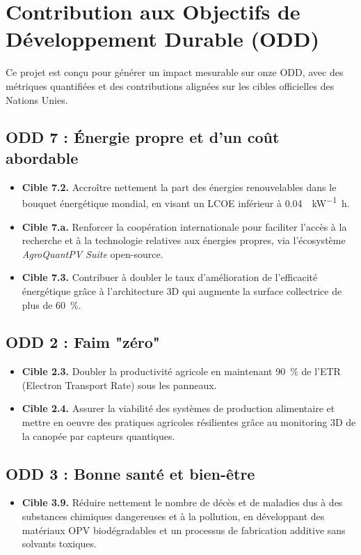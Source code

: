 \documentclass[12pt, a4paper]{article}
\begin{document}
\section{Contribution aux Objectifs de Développement Durable (ODD)}

Ce projet est conçu pour générer un impact mesurable sur onze ODD, avec des métriques quantifiées et des contributions alignées sur les cibles officielles des Nations Unies.

\subsection{ODD 7 : Énergie propre et d'un coût abordable}
\begin{itemize}
    \item \textbf{Cible 7.2.} Accroître nettement la part des énergies renouvelables dans le bouquet énergétique mondial, en visant un LCOE inférieur à \SI{0.04}{\dollar\per\kilo\watt\hour}.
    \item \textbf{Cible 7.a.} Renforcer la coopération internationale pour faciliter l'accès à la recherche et à la technologie relatives aux énergies propres, via l'écosystème \textit{AgroQuantPV Suite} open-source.
    \item \textbf{Cible 7.3.} Contribuer à doubler le taux d'amélioration de l'efficacité énergétique grâce à l'architecture 3D qui augmente la surface collectrice de plus de \SI{60}{\percent}.
\end{itemize}

\subsection{ODD 2 : Faim "zéro"}
\begin{itemize}
    \item \textbf{Cible 2.3.} Doubler la productivité agricole en maintenant \SI{90}{\percent} de l'ETR (Electron Transport Rate) sous les panneaux.
    \item \textbf{Cible 2.4.} Assurer la viabilité des systèmes de production alimentaire et mettre en oeuvre des pratiques agricoles résilientes grâce au monitoring 3D de la canopée par capteurs quantiques.
\end{itemize}

\subsection{ODD 3 : Bonne santé et bien-être}
\begin{itemize}
    \item \textbf{Cible 3.9.} Réduire nettement le nombre de décès et de maladies dus à des substances chimiques dangereuses et à la pollution, en développant des matériaux OPV biodégradables et un processus de fabrication additive sans solvants toxiques.
\end{itemize}
\end{document}
